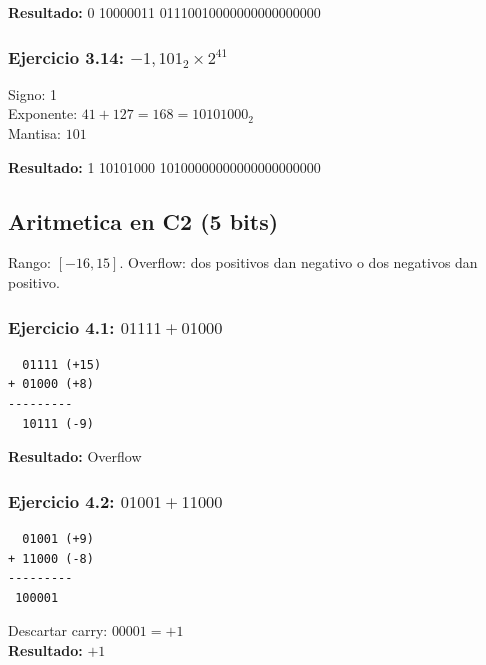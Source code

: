 \documentclass[12pt,a4paper]{article}
\begin{document}
\textbf{Resultado:} 0 10000011 01110010000000000000000

\subsubsection{Ejercicio 3.14: $-1,101_2 \times 2^{41}$}

Signo: 1\\
Exponente: $41 + 127 = 168 = 10101000_2$\\
Mantisa: $101$

\textbf{Resultado:} 1 10101000 10100000000000000000000

\subsection{Aritmetica en C2 (5 bits)}

Rango: $[-16, 15]$. Overflow: dos positivos dan negativo o dos negativos dan positivo.

\begin{minipage}[t]{0.48\textwidth}
\subsubsection{Ejercicio 4.1: $01111 + 01000$}
\begin{verbatim}
  01111 (+15)
+ 01000 (+8)
---------
  10111 (-9)
\end{verbatim}
\textbf{Resultado:} Overflow
\end{minipage}
\hfill
\begin{minipage}[t]{0.48\textwidth}
\subsubsection{Ejercicio 4.2: $01001 + 11000$}
\begin{verbatim}
  01001 (+9)
+ 11000 (-8)
---------
 100001
\end{verbatim}
Descartar carry: $00001 = +1$\\
\textbf{Resultado:} $+1$
\end{minipage}

\vspace{0.5cm}
\end{document}
